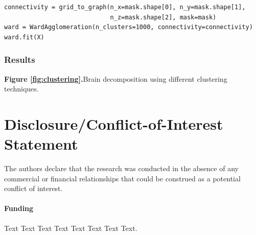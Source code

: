 \documentclass{frontiersSCNS} %
\begin{document}
\begin{lstlisting}
connectivity = grid_to_graph(n_x=mask.shape[0], n_y=mask.shape[1],
                             n_z=mask.shape[2], mask=mask)
ward = WardAgglomeration(n_clusters=1000, connectivity=connectivity)
ward.fit(X)
\end{lstlisting}

\subsubsection{Results}

\textbf{Figure \ref{fig:clustering}.}{Brain decomposition using different clustering techniques.}\label{fig:04}


\section*{Disclosure/Conflict-of-Interest Statement}
The authors declare that the research was conducted in the absence of any
commercial or financial relationships that could be construed as a potential
conflict of interest.

\paragraph{Funding\textcolon} Text Text Text Text Text Text  Text Text.



\newpage
\end{document}
